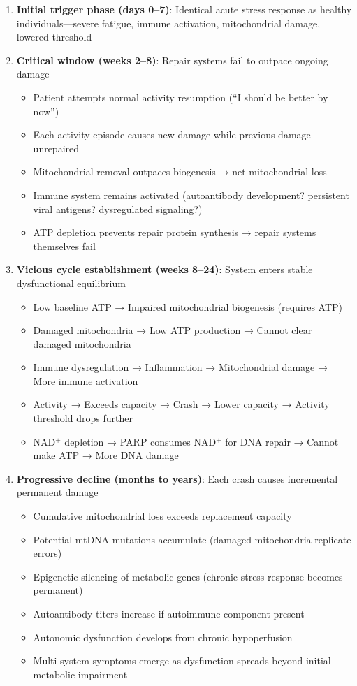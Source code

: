 \begin{enumerate}
    \item \textbf{Initial trigger phase (days 0--7)}: Identical acute stress response as healthy individuals---severe fatigue, immune activation, mitochondrial damage, lowered threshold

    \item \textbf{Critical window (weeks 2--8)}: Repair systems fail to outpace ongoing damage
    \begin{itemize}
        \item Patient attempts normal activity resumption (``I should be better by now'')
        \item Each activity episode causes new damage while previous damage unrepaired
        \item Mitochondrial removal outpaces biogenesis → net mitochondrial loss
        \item Immune system remains activated (autoantibody development? persistent viral antigens? dysregulated signaling?)
        \item ATP depletion prevents repair protein synthesis → repair systems themselves fail
    \end{itemize}

    \item \textbf{Vicious cycle establishment (weeks 8--24)}: System enters stable dysfunctional equilibrium
    \begin{itemize}
        \item Low baseline ATP → Impaired mitochondrial biogenesis (requires ATP)
        \item Damaged mitochondria → Low ATP production → Cannot clear damaged mitochondria
        \item Immune dysregulation → Inflammation → Mitochondrial damage → More immune activation
        \item Activity → Exceeds capacity → Crash → Lower capacity → Activity threshold drops further
        \item NAD$^+$ depletion → PARP consumes NAD$^+$ for DNA repair → Cannot make ATP → More DNA damage
    \end{itemize}

    \item \textbf{Progressive decline (months to years)}: Each crash causes incremental permanent damage
    \begin{itemize}
        \item Cumulative mitochondrial loss exceeds replacement capacity
        \item Potential mtDNA mutations accumulate (damaged mitochondria replicate errors)
        \item Epigenetic silencing of metabolic genes (chronic stress response becomes permanent)
        \item Autoantibody titers increase if autoimmune component present
        \item Autonomic dysfunction develops from chronic hypoperfusion
        \item Multi-system symptoms emerge as dysfunction spreads beyond initial metabolic impairment
    \end{itemize}
\end{enumerate}

